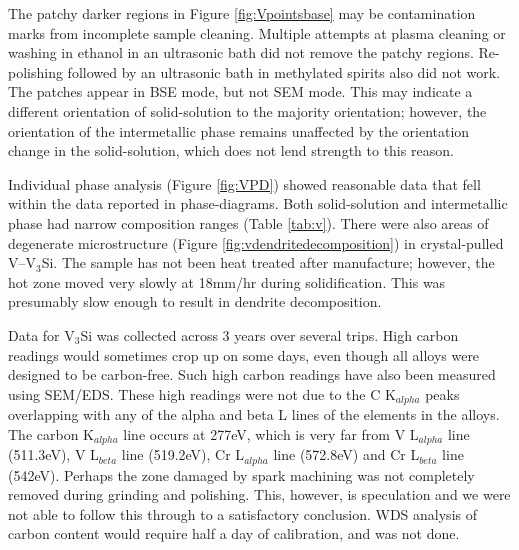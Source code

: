 The patchy darker regions in Figure \ref{fig:Vpointsbase} may be contamination marks from incomplete sample cleaning.  Multiple attempts at plasma cleaning or washing in ethanol in an ultrasonic bath did not remove the patchy regions.  Re-polishing followed by an ultrasonic bath in methylated spirits also did not work.  The patches appear in BSE mode, but not SEM mode.  This may indicate a different orientation of solid-solution to the majority orientation; however, the orientation of the intermetallic phase remains unaffected by the orientation change in the solid-solution, which does not lend strength to this reason.

Individual phase analysis (Figure \ref{fig:VPD}) showed reasonable data that fell within the data reported in phase-diagrams.
Both solid-solution and intermetallic phase had narrow composition ranges (Table \ref{tab:v}). 
There were also areas of degenerate microstructure (Figure \ref{fig:vdendritedecomposition}) in crystal-pulled V--V$_3$Si.  The sample has not been heat treated after manufacture; however, the hot zone moved very slowly at 18mm/hr during solidification.  This was presumably slow enough to result in dendrite decomposition.

Data for V$_3$Si was collected across 3 years over several trips.  High carbon readings would sometimes crop up on some days, even though all alloys were designed to be carbon-free.  Such high carbon readings have also been measured using SEM/EDS.  These high readings were not due to the C K$_{alpha}$ peaks overlapping with any of the alpha and beta L lines of the elements in the alloys.  The carbon K$_{alpha}$ line occurs at 277eV, which is very far from V L$_{alpha}$ line (511.3eV), V L$_{beta}$ line (519.2eV), Cr L$_{alpha}$ line (572.8eV) and Cr L$_{beta}$ line (542eV).  Perhaps the zone damaged by spark machining was not completely removed during grinding and polishing.  This, however, is speculation and we were not able to follow this through to a satisfactory conclusion.  WDS analysis of carbon content would require half a day of calibration, and was not done.

